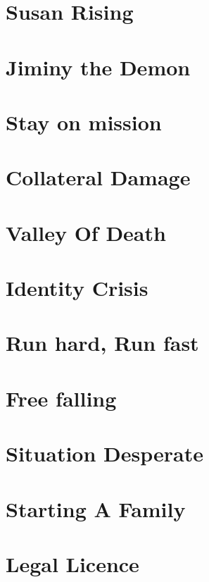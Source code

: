 \chapter{Susan Rising}

\chapter{Jiminy the Demon}

\chapter{Stay on mission}

\chapter{Collateral Damage}

\chapter{Valley Of Death}

\chapter{Identity Crisis}

\chapter{Run hard, Run fast}

\chapter{Free falling}

\chapter{Situation Desperate}

\chapter{Starting A Family}

\chapter{Legal Licence}

